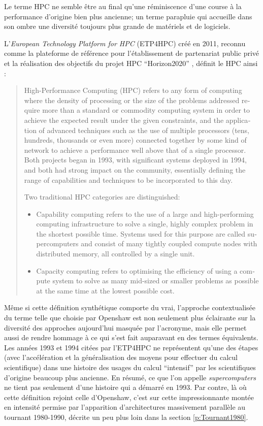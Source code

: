 Le terme HPC ne semble être au final qu'une réminiscence d'une course à la performance d'origine bien plus ancienne; un terme parapluie qui accueille dans son ombre une diversité toujours plus grande de matériels et de logiciels.

L'\textit{European Technology Platform for HPC} (ETP4HPC) créé en 2011, reconnu comme la plateforme de référence pour l'établissement de partenariat public privé et la réalisation des objectifs du projet HPC \enquote{Horizon2020} , définit le HPC ainsi :

\foreignblockquote{english}[\cite{ETP4HPC2013}]{
High-Performance Computing (HPC) refers to any form of computing where the density of processing or the size of the problems addressed require more than a standard or commodity computing system in order to achieve the expected result under the given constraints, and the application of advanced techniques such as the use of multiple processors (tens, hundreds, thousands or even more) connected together by some kind of network to achieve a performance well above that of a single processor. Both projects began in 1993, with significant systems deployed in 1994, and both had strong
impact on the community, essentially defining the range
of capabilities and techniques to be incorporated to this
day.

Two traditional HPC categories are distinguished:

\begin{itemize}
\item Capability computing refers to the use of a large and high-performing computing infrastructure to solve a single, highly complex problem in the shortest possible time. Systems used for this purpose are called supercomputers and consist of many tightly coupled compute nodes with distributed memory, all controlled by a single unit.

\item Capacity computing refers to optimising the efficiency of using a compute system to solve as many mid-sized or smaller problems as possible at the same time at the lowest possible cost.
\end{itemize}
}

Même si cette définition synthétique comporte du vrai, l'approche contextualisée du terme telle que choisie par Openshaw est non seulement plus éclairante sur la diversité des approches aujourd'hui masquée par l'acronyme, mais elle permet aussi de rendre hommage à ce qui s'est fait auparavant en des termes équivalents. Les années 1993 et 1994 citées par l'ETP4HPC ne représentent qu'une des étapes (avec l'accélération et la généralisation des moyens pour effectuer du calcul scientifique) dans une histoire des usages du calcul \enquote{intensif} par les scientifiques d'origine beaucoup plus ancienne. En résumé, ce que l'on appelle \textit{supercomputers} ne tient pas seulement d'une histoire qui a démarré en 1993. Par contre, là où cette définition rejoint celle d'Openshaw, c'est sur cette impressionnante montée en intensité permise par l'apparition d'architectures massivement parallèle au tournant 1980-1990, décrite un peu plus loin dans la section \ref{p:Tournant1980}.

